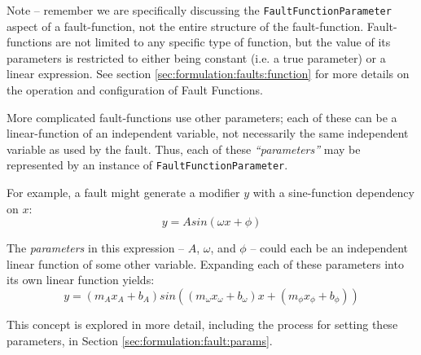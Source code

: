 \documentclass[11pt,fleqn]{report}
\begin{document}
Note -- remember we are specifically discussing the
\verb'FaultFunctionParameter'
aspect of a fault-function, not the entire structure of the fault-function.
Fault-functions are not limited to any specific type of function, but the value
of its parameters is restricted to either being constant (i.e. a true parameter)
or a linear expression. See section \ref{sec:formulation:faults:function} for
more details on the operation and configuration of Fault Functions.

More complicated fault-functions use other parameters; each of these can be a
linear-function of an independent variable, not necessarily the same
independent variable as used by the fault. Thus, each of these
\textit{``parameters''}
may be represented by an instance of \verb'FaultFunctionParameter'.

For example, a fault might generate a modifier $y$ with a sine-function
dependency on $x$:
\begin{equation*}
 y= Asin(\omega x + \phi)
\end{equation*}

The \textit{parameters} in this expression -- $A$, $\omega$, and $\phi$ --
could each be an independent linear function of some other variable.
Expanding each of these parameters into its own linear function
yields:
\begin{equation*}
y= (m_A x_A + b_A) sin((m_\omega x_\omega + b_\omega)x +
(m_\phi x_\phi + b_\phi))
\end{equation*}

This concept is explored in more detail, including the process for setting
these parameters, in Section \ref{sec:formulation:fault:params}.
\end{document}
